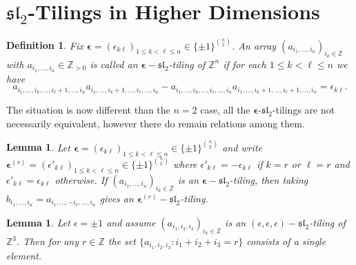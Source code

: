 \documentclass{amsart}
\newtheorem{definition}[theorem]{Definition}
\newtheorem{lemma}[theorem]{Lemma}
\newcommand{\bepsilon}{\boldsymbol{\epsilon}}
\newcommand{\fsl}{\mathfrak{sl}}
\newcommand{\ZZ}{\mathbb{Z}}
\begin{document}
  \section{$\fsl_2$-Tilings in Higher Dimensions}
    \begin{definition}
      Fix $\bepsilon=(\epsilon_{k\ell})_{1\le k<\ell\le n}\in\{\pm1\}^{{n\choose 2}}$.  An array $(a_{i_1,\ldots,i_n})_{i_k\in\ZZ}$ with $a_{i_1,\ldots,i_n}\in\ZZ_{>0}$ is called an \emph{$\bepsilon-\fsl_2$-tiling of $\ZZ^n$} if for each $1\le k<\ell\le n$ we have
      \begin{equation}\label{eq:higher sl2 recursion}
        a_{i_1,\ldots,i_k,\ldots,i_\ell+1,\ldots,i_n}a_{i_1,\ldots,i_k+1,\ldots,i_\ell,\ldots,i_n}-a_{i_1,\ldots,i_k,\ldots,i_\ell,\ldots,i_n}a_{i_1,\ldots,i_k+1,\ldots,i_\ell+1,\ldots,i_n}=\epsilon_{k\ell}.
      \end{equation}
    \end{definition}
    The situation is now different than the $n=2$ case, all the $\bepsilon$-$\fsl_2$-tilings are not necessarily equivalent, however there do remain relations among them.
    \begin{lemma}\label{le:relabel}
      Let $\bepsilon=(\epsilon_{k\ell})_{1\le k<\ell\le n}\in\{\pm1\}^{{n\choose 2}}$ and write $\bepsilon^{(r)}=(\epsilon'_{k\ell})_{1\le k<\ell\le n}\in\{\pm1\}^{{n\choose 2}}$ where $\epsilon'_{k\ell}=-\epsilon_{k\ell}$ if $k=r$ or $\ell=r$ and $\epsilon'_{k\ell}=\epsilon_{k\ell}$ otherwise.  If $(a_{i_1,\ldots,i_n})_{i_k\in\ZZ}$ is an $\bepsilon-\fsl_2$-tiling, then taking $b_{i_1,\ldots,i_n}=a_{i_1,\ldots,-i_r,\ldots,i_n}$ gives an $\bepsilon^{(r)}-\fsl_2$-tiling.
    \end{lemma}
    \begin{lemma}\label{le:constant slices}
      Let $\epsilon=\pm1$ and assume $(a_{i_1,i_2,i_3})_{i_k\in\ZZ}$ is an $(\epsilon,\epsilon,\epsilon)-\fsl_2$-tiling of $\ZZ^3$.  Then for any $r\in\ZZ$ the set $\{a_{i_1,i_2,i_3}:i_1+i_2+i_3=r\}$ consists of a single element.
    \end{lemma}
\end{document}

